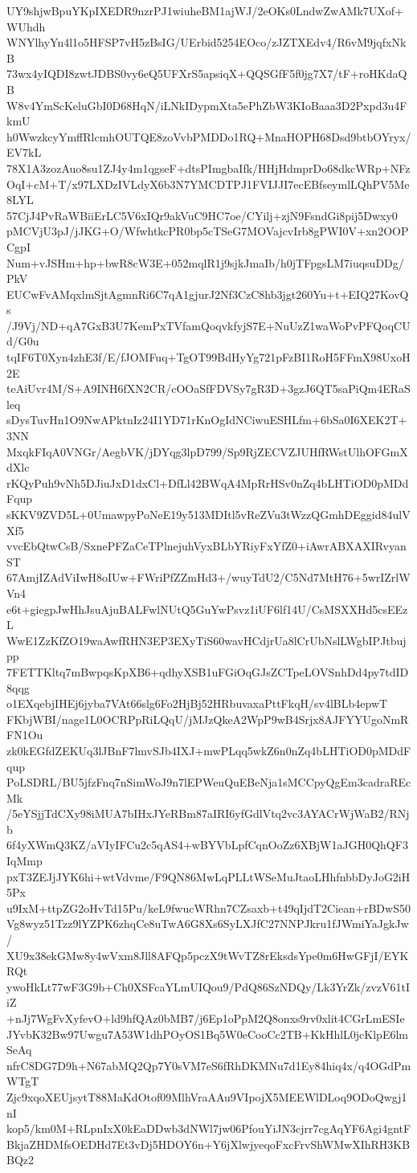 UY9shjwBpuYKpIXEDR9nzrPJ1wiuheBM1ajWJ/2eOKs0LndwZwAMk7UXof+WUhdh
WNYlhyYn4l1o5HFSP7vH5zBsIG/UErbid5254EOco/zJZTXEdv4/R6vM9jqfxNkB
73wx4yIQDI8zwtJDBS0vy6eQ5UFXrS5apsiqX+QQSGfF5f0jg7X7/tF+roHKdaQB
W8v4YmScKeluGbI0D68HqN/iLNkIDypmXta5ePhZbW3KIoBaaa3D2Pxpd3u4FkmU
h0WwzkcyYmffRlcmhOUTQE8zoVvbPMDDo1RQ+MnaHOPH68Dsd9btbOYryx/EV7kL
78X1A3zozAuo8su1ZJ4y4m1qgseF+dtsPImgbaIfk/HHjHdmprDo68dkcWRp+NFz
OqI+cM+T/x97LXDzIVLdyX6b3N7YMCDTPJ1FVIJJI7ecEBfseymlLQhPV5Me8LYL
57CjJ4PvRaWBiiErLC5V6xIQr9akVuC9HC7oe/CYilj+zjN9FsndGi8pij5Dwxy0
pMCVjU3pJ/jJKG+O/WfwhtkcPR0bp5cTSeG7MOVajcvIrb8gPWI0V+xn2OOPCgpI
Num+vJSHm+hp+bwR8cW3E+052mqlR1j9sjkJmaIb/h0jTFpgsLM7iuqsuDDg/PkV
EUCwFvAMqxlmSjtAgmnRi6C7qA1gjurJ2Nf3CzC8hb3jgt260Yu+t+EIQ27KovQs
/J9Vj/ND+qA7GxB3U7KemPxTVfamQoqvkfyjS7E+NuUzZ1waWoPvPFQoqCUd/G0u
tqIF6T0Xyn4zhE3f/E/fJOMFuq+TgOT99BdHyYg721pFzBI1RoH5FFmX98UxoH2E
teAiUvr4M/S+A9INH6fXN2CR/cOOaSfFDVSy7gR3D+3gzJ6QT5saPiQm4ERaSleq
sDysTuvHn1O9NwAPktnIz24I1YD71rKnOgIdNCiwuESHLfm+6bSa0I6XEK2T+3NN
MxqkFIqA0VNGr/AegbVK/jDYqg3lpD799/Sp9RjZECVZJUHfRWstUlhOFGmXdXlc
rKQyPuh9vNh5DJiuJxD1dxCl+DfLl42BWqA4MpRrHSv0nZq4bLHTiOD0pMDdFqup
sKKV9ZVD5L+0UmawpyPoNeE19y513MDItl5vReZVu3tWzzQGmhDEggid84ulVXf5
vvcEbQtwCsB/SxnePFZaCeTPlnejuhVyxBLbYRiyFxYfZ0+iAwrABXAXIRvyanST
67AmjIZAdViIwH8oIUw+FWriPfZZmHd3+/wuyTdU2/C5Nd7MtH76+5wrIZrlWVn4
e6t+giegpJwHhJsuAjuBALFwlNUtQ5GuYwPsvz1iUF6lf14U/CsMSXXHd5csEEzL
WwE1ZzKfZO19waAwfRHN3EP3EXyTiS60wavHCdjrUa8lCrUbNslLWgbIPJtbujpp
7FETTKltq7mBwpqsKpXB6+qdhyXSB1uFGiOqGJsZCTpeLOVSnhDd4py7tdID8qqg
o1EXqebjIHEj6jyba7VAt66slg6Fo2HjBj52HRbuvaxaPttFkqH/sv4lBLb4epwT
FKbjWBI/nage1L0OCRPpRiLQqU/jMJzQkeA2WpP9wB4Srjx8AJFYYUgoNmRFN1Ou
zk0kEGfdZEKUq3lJBnF7lmvSJb4IXJ+mwPLqq5wkZ6n0nZq4bLHTiOD0pMDdFqup
PoLSDRL/BU5jfzFnq7nSimWoJ9n7lEPWeuQuEBeNja1sMCCpyQgEm3cadraREcMk
/5eYSjjTdCXy98iMUA7bIHxJYeRBm87aIRI6yfGdlVtq2vc3AYACrWjWaB2/RNjb
6f4yXWmQ3KZ/aVIyIFCu2c5qAS4+wBYVbLpfCqnOoZz6XBjW1aJGH0QhQF3IqMmp
pxT3ZEJjJYK6hi+wtVdvme/F9QN86MwLqPLLtWSeMuJtaoLHhfnbbDyJoG2iH5Px
u9IxM+ttpZG2oHvTd15Pu/keL9fwucWRhn7CZsaxb+t49qIjdT2Ciean+rBDwS50
Vg8wyz51Tzz9lYZPK6zhqCe8uTwA6G8Xs6SyLXJfC27NNPJkru1fJWmiYaJgkJw/
XU9x38ekGMw8y4wVxm8Jll8AFQp5pczX9tWvTZ8rEksdsYpe0m6HwGFjI/EYKRQt
ywoHkLt77wF3G9b+Ch0XSFcaYLmUIQou9/PdQ86SzNDQy/Lk3YrZk/zvzV61tIiZ
+nJj7WgFvXyfevO+ld9hfQAz0bMB7/j6Ep1oPpM2Q8onxs9rv0xlit4CGrLmESIe
JYvbK32Bw97Uwgu7A53W1dhPOyOS1Bq5W0eCooCc2TB+KkHhlL0jcKlpE6lmSeAq
nfrC8DG7D9h+N67abMQ2Qp7Y0sVM7eS6fRhDKMNu7d1Ey84hiq4x/q4OGdPmWTgT
Zjc9xqoXEUjsytT88MaKdOtof09MlhVraAAu9VIpojX5MEEWlDLoq9ODoQwgj1nI
kop5/km0M+RLpnIxX0kEaDDwb3dNWl7jw06PfouYiJN3cjrr7cgAqYF6Agi4gntF
BkjaZHDMfsOEDHd7Et3vDj5HDOY6n+Y6jXlwjyeqoFxcFrvShWMwXIhRH3KBBQz2
